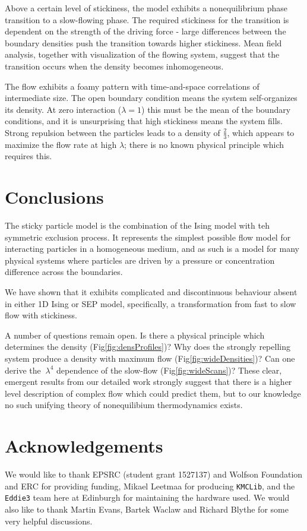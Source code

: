 \documentclass[
reprint, amsmath,amssymb, aps,
 prx,
]{revtex4-1}
\begin{document}
Above a certain level of stickiness, the model exhibits a
nonequilibrium phase transition to a slow-flowing phase.  The required
stickiness for the transition is dependent on the strength of the
driving force - large differences between the boundary densities push
the transition towards higher stickiness.  Mean field analysis, together
with visualization of the flowing system, suggest that the transition
occurs when the density becomes inhomogeneous.

The flow exhibits a foamy pattern with time-and-space
correlations of intermediate size.  
The open boundary condition means the system self-organizes its
density.  At zero interaction ($\lambda=1$) this must be the mean of
the boundary conditions, and it is unsurprising that high stickiness
means the system fills.  Strong repulsion between the particles leads
to a density of $\frac{2}{3}$, which appears to maximize the flow rate
at high $\lambda$; there is no known physical principle which requires this.

\section{Conclusions}

The sticky particle model is the combination of the Ising model with
teh symmetric exclusion process.  It represents the simplest possible
flow model for interacting particles in a homogeneous medium, and as
such is a model for many physical systems where particles are driven
by a pressure or concentration difference across the boundaries.

We have shown that it exhibits complicated and discontinuous behaviour
absent in either 1D Ising or SEP model, specifically, a transformation
from fast to slow flow with stickiness. 

A number of questions remain open.  Is there a physical principle
which determines the density (Fig\ref{fig:densProfiles})?  Why does
the strongly repelling system produce a density with maximum flow
(Fig\ref{fig:wideDensities})?  Can one derive the $~\lambda^4$
dependence of the slow-flow (Fig\ref{fig:wideScans})?  These clear,
emergent results from our detailed work strongly suggest that there is a higher
level description of complex flow which could predict
them, but to our knowledge no such unifying theory of nonequilibium
thermodynamics exists.




\section*{Acknowledgements}
We would like to thank EPSRC (student grant 1527137) and Wolfson
Foundation and ERC for providing funding, Mikael Leetmaa for producing
\texttt{KMCLib}, and the \texttt{Eddie3} team here at Edinburgh for
maintaining the hardware used.  We would also like to thank Martin
Evans, Bartek Waclaw and Richard Blythe for some very helpful
discussions.


\end{document}
